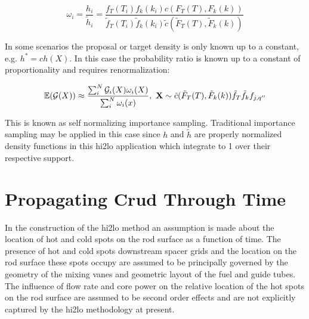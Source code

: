 \begin{equation}
\omega_i = \frac{h_i}{\tilde h_i} = \frac{f_T(T_i) f_k(k_i)c(F_T(T), F_k(k))}
  {\tilde f_T(T_i) \tilde f_k(k_i) \tilde c(\tilde F_T(T), \tilde F_k(k))}
\label{eq:imp_prob_ratio}
\end{equation}

%
%

In some scenarios the proposal or target density is only known up to a constant, e.g. $h^* = c h(X)$.  In this case the probability ratio is known up to a constant of proportionality and requires renormalization:

\begin{equation}
\operatorname*{\mathbb{E}}(\mathcal G(X)) \approx \frac{ \sum_i^N \mathcal G_i(X) \omega_i(X)}{\sum_i^N \omega_i(x)}
,
 \ \mathbf X \sim \tilde c(\tilde F_T(T), \tilde F_k(k)) \tilde f_T \tilde f_k f_{j,q''}
\end{equation}

This is known as self normalizing importance sampling.  Traditional importance sampling may be applied in this case since $h$ and $\tilde{h}$ are properly normalized density functions in this hi2lo application which integrate to 1 over their respective support.


\section{Propagating Crud Through Time}

In the construction of the hi2lo method an assumption is made about the location of hot and cold spots on the rod surface as a function of time.   The presence of hot and cold spots downstream spacer grids and the location on the rod surface these spots occupy are assumed to be principally governed by the geometry of the mixing vanes and geometric layout of the fuel and guide tubes.  The influence of flow rate and core power on the relative location of the hot spots on the rod surface are assumed to be second order effects and are not explicitly captured by the hi2lo methodology at present.

